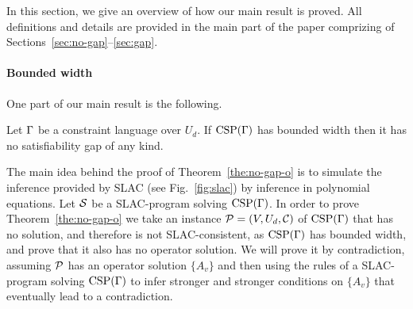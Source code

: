 In this section, we give an overview of how our main result is proved. All
definitions and details are provided in the main part of the paper comprizing of
Sections~\ref{sec:no-gap}--\ref{sec:gap}.

\paragraph{Bounded width}

One part of our main result is the following.

\begin{theorem}\label{the:no-gap-o}
Let $\Gamma$ be a constraint language over $U_d$. If ${\rm CSP}(\Gamma)$ has bounded
width then it has no satisfiability gap of any kind.
\end{theorem}

The main idea behind the proof of Theorem~\ref{the:no-gap-o} 
is to simulate the inference provided by SLAC (see Fig.~\ref{fig:slac}) 
by inference in polynomial equations. Let ${\mathcal S}$ be a SLAC-program solving ${\rm CSP}(\Gamma)$.
%
In order to prove Theorem~\ref{the:no-gap-o} we take an instance ${\mathcal P}=(V,U_d,{\mathcal C})$ of ${\rm CSP}(\Gamma)$ that has no solution, and therefore  is not SLAC-consistent, as ${\rm CSP}(\Gamma)$ has bounded width, and prove that it also has no operator solution. We will prove it by contradiction, assuming ${\mathcal P}$ has an operator solution $\{A_v\}$ and then using the rules of a SLAC-program solving ${\rm CSP}(\Gamma)$ to infer stronger and stronger conditions on $\{A_v\}$ that eventually lead to a contradiction. 

